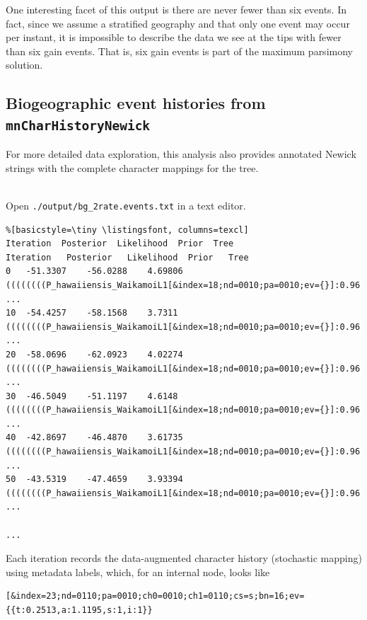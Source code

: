 One interesting facet of this output is there are never fewer than six events.
In fact, since we assume a stratified geography and that only one event may occur per instant, it is impossible to describe the data we see at the tips with fewer than six gain events.
That is, six gain events is part of the maximum parsimony solution.

\subsection{Biogeographic event histories from {\tt mnCharHistoryNewick}}

For more detailed data exploration, this analysis also provides annotated Newick strings with the complete character mappings for the tree.

\noindent \\ \impmark Open {\tt ./output/bg\_2rate.events.txt} in a text editor.

\begin{framed}
\begin{lstlisting}%[basicstyle=\tiny \listingsfont, columns=texcl]
Iteration  Posterior  Likelihood  Prior  Tree
Iteration	Posterior	Likelihood	Prior	Tree
0	-51.3307	-56.0288	4.69806	((((((((P_hawaiiensis_WaikamoiL1[&index=18;nd=0010;pa=0010;ev={}]:0.96 ...
10	-54.4257	-58.1568	3.7311	((((((((P_hawaiiensis_WaikamoiL1[&index=18;nd=0010;pa=0010;ev={}]:0.96 ...
20	-58.0696	-62.0923	4.02274	((((((((P_hawaiiensis_WaikamoiL1[&index=18;nd=0010;pa=0010;ev={}]:0.96 ...
30	-46.5049	-51.1197	4.6148	((((((((P_hawaiiensis_WaikamoiL1[&index=18;nd=0010;pa=0010;ev={}]:0.96 ...
40	-42.8697	-46.4870	3.61735	((((((((P_hawaiiensis_WaikamoiL1[&index=18;nd=0010;pa=0010;ev={}]:0.96 ...
50	-43.5319	-47.4659	3.93394	((((((((P_hawaiiensis_WaikamoiL1[&index=18;nd=0010;pa=0010;ev={}]:0.96 ...

...
\end{lstlisting}
\end{framed}

Each iteration records the data-augmented character history (stochastic mapping) using metadata labels, which, for an internal node, looks like

\begin{snugshade}
\begin{lstlisting}
[&index=23;nd=0110;pa=0010;ch0=0010;ch1=0110;cs=s;bn=16;ev={{t:0.2513,a:1.1195,s:1,i:1}}
\end{lstlisting}
\end{snugshade}

